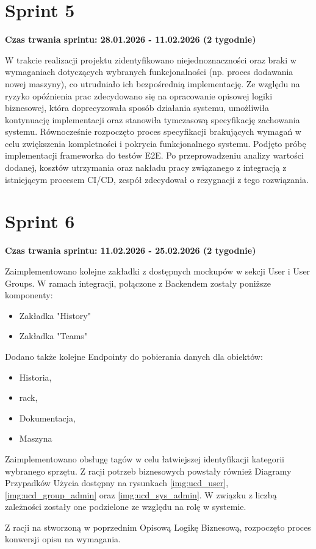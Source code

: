 \section{Sprint 5}
\textbf{Czas trwania \Gls{sprint}u: 28.01.2026 - 11.02.2026 (2 tygodnie)}
\par
W trakcie realizacji projektu zidentyfikowano niejednoznaczności oraz braki w wymaganiach dotyczących wybranych funkcjonalności (np. proces dodawania nowej maszyny), co utrudniało ich bezpośrednią implementację. Ze względu na ryzyko opóźnienia prac zdecydowano się na opracowanie opisowej logiki biznesowej, która doprecyzowała sposób działania systemu, umożliwiła kontynuację implementacji oraz stanowiła tymczasową specyfikację zachowania systemu. Równocześnie rozpoczęto proces specyfikacji brakujących wymagań w celu zwiększenia kompletności i pokrycia funkcjonalnego systemu.
Podjęto próbę implementacji \gls{framework}a do testów \gls{E2E}. Po przeprowadzeniu analizy wartości dodanej, kosztów utrzymania oraz nakładu pracy związanego z integracją z istniejącym procesem \gls{CI/CD}, zespół zdecydował o rezygnacji z tego rozwiązania.


\section{Sprint 6}
\textbf{Czas trwania \Gls{sprint}u: 11.02.2026 - 25.02.2026 (2 tygodnie)}
\par
Zaimplementowano kolejne zakładki z dostępnych \gls{mockup}ów w sekcji User i User Groups.
W ramach integracji, połączone z \gls{Backend}em zostały poniższe komponenty:
\begin{itemize}
    \item Zakładka "History"
    \item Zakładka "Teams"
\end{itemize}
Dodano także kolejne \gls{Endpoint}y do pobierania danych dla obiektów:
\begin{itemize}
    \item Historia,
    \item \gls{rack},
    \item Dokumentacja,
    \item Maszyna
\end{itemize}
Zaimplementowano obsługę tagów w celu łatwiejszej identyfikacji kategorii wybranego sprzętu.
Z racji potrzeb biznesowych powstały również Diagramy Przypadków Użycia dostępny na rysunkach \ref{img:ucd_user}, \ref{img:ucd_group_admin} oraz \ref{img:ucd_sys_admin}.
W związku z liczbą zależności zostały one podzielone ze względu na rolę w systemie.
\par
Z racji na stworzoną w poprzednim  Opisową Logikę Biznesową, rozpoczęto proces konwersji opisu na wymagania.


